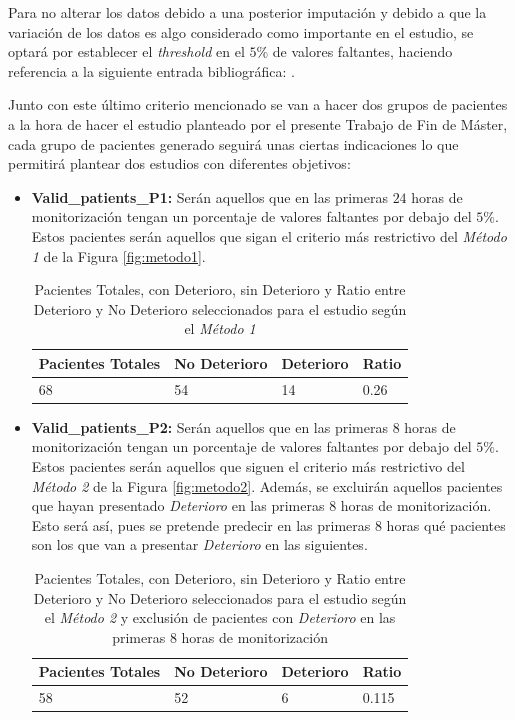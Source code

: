 Para no alterar los datos debido a una posterior imputación y debido a que la variación de los datos es algo considerado como importante en el estudio, se optará por establecer el \textit{threshold} en el $5 \%$ de valores faltantes, haciendo referencia a la siguiente entrada bibliográfica: \cite{Scheffer2002}. 

Junto con este último criterio mencionado se van a hacer dos grupos de pacientes a la hora de hacer el estudio planteado por el presente Trabajo de Fin de Máster, cada grupo de pacientes generado seguirá unas ciertas indicaciones lo que permitirá plantear dos estudios con diferentes objetivos:

\begin{itemize}
    \item \textbf{Valid\_patients\_P1:} Serán aquellos que en las primeras $24$ horas de monitorización tengan un porcentaje de valores faltantes por debajo del $5\%$. Estos pacientes serán aquellos que sigan el criterio más restrictivo del \textit{Método 1} de la Figura \ref{fig:metodo1}. 
    \begin{table}[H]
        \centering
        \begin{tabular}{|m{2cm}|m{2.25cm}|m{2cm}|m{2cm}|}
        \hline
            Pacientes Totales & No Deterioro & Deterioro & Ratio \\ \hline
            68 & 54 & 14 & 0.26 \\ \hline
        \end{tabular}
        \caption{Pacientes Totales, con Deterioro, sin Deterioro y Ratio entre Deterioro y No Deterioro seleccionados para el estudio según el \textit{Método 1}}\label{tabla:ratio-deterioro-P1}
    \end{table}
    \item \textbf{Valid\_patients\_P2:} Serán aquellos que en las primeras $8$ horas de monitorización tengan un porcentaje de valores faltantes por debajo del $5\%$. Estos pacientes serán aquellos que siguen el criterio más restrictivo del \textit{Método 2} de la Figura \ref{fig:metodo2}. Además, se excluirán aquellos pacientes que hayan presentado \textit{Deterioro} en las primeras $8$ horas de monitorización. Esto será así, pues se pretende predecir en las primeras $8$ horas qué pacientes son los que van a presentar \textit{Deterioro} en las siguientes.
    \begin{table}[H]
        \centering
        \begin{tabular}{|m{2cm}|m{2.25cm}|m{2cm}|m{2cm}|}
        \hline
            Pacientes Totales & No Deterioro & Deterioro & Ratio \\ \hline
            58 & 52 & 6 & 0.115 \\ \hline
        \end{tabular}
        \caption{Pacientes Totales, con Deterioro, sin Deterioro y Ratio entre Deterioro y No Deterioro seleccionados para el estudio según el \textit{Método 2} y exclusión de pacientes con \textit{Deterioro} en las primeras 8 horas de monitorización}
            \label{tabla:ratio-deterioro-P1}
    \end{table}
\end{itemize}

